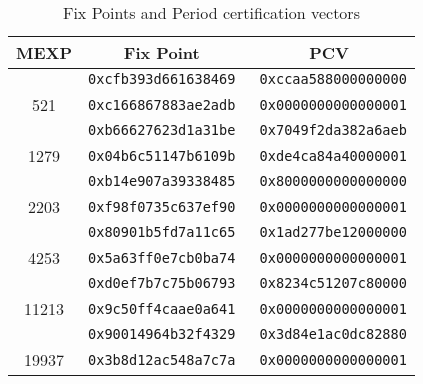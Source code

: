 \documentclass{svmult}
\begin{document}
\begin{table}
  \begin{center}
    \caption{Fix Points and Period certification vectors}
    \label{tab:pcv}
    \begin{tabular}{c|rr} \hline
      MEXP & \multicolumn{1}{c}{Fix Point} 
      & \multicolumn{1}{c}{PCV} \\ \hline \hline
      & \texttt{0xcfb393d661638469} & \texttt{0xccaa588000000000} \\
      521 & \texttt{0xc166867883ae2adb} &\texttt{ 0x0000000000000001} \\ \hline
      & \texttt{0xb66627623d1a31be} & \texttt{0x7049f2da382a6aeb} \\
      1279 & \texttt{0x04b6c51147b6109b} & \texttt{0xde4ca84a40000001} \\ \hline
      & \texttt{0xb14e907a39338485} & \texttt{0x8000000000000000} \\
      2203 & \texttt{0xf98f0735c637ef90} & \texttt{0x0000000000000001} \\ \hline
      & \texttt{0x80901b5fd7a11c65} & \texttt{0x1ad277be12000000} \\
      4253 & \texttt{0x5a63ff0e7cb0ba74} & \texttt{0x0000000000000001} \\ \hline
      & \texttt{0xd0ef7b7c75b06793} & \texttt{0x8234c51207c80000} \\
      11213 & \texttt{0x9c50ff4caae0a641} & \texttt{0x0000000000000001}\\ \hline
      & \texttt{0x90014964b32f4329} & \texttt{0x3d84e1ac0dc82880} \\
      19937 & \texttt{0x3b8d12ac548a7c7a} & \texttt{0x0000000000000001} \\ 
      \hline
    \end{tabular}
  \end{center}
\end{table}


\end{document}
